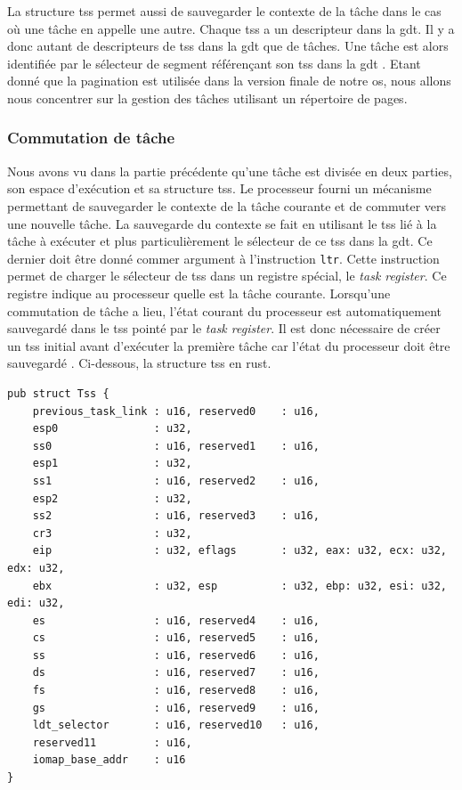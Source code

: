 La structure \acrshort{tss} permet aussi de sauvegarder le contexte de la tâche
dans le cas où une tâche en appelle une autre. Chaque \acrshort{tss} a un descripteur
dans la \acrshort{gdt}. Il y a donc autant de descripteurs de \acrshort{tss} dans
la \acrshort{gdt} que de tâches. Une tâche est alors identifiée par le sélecteur
de segment référençant son \acrshort{tss} dans la \acrshort{gdt} \cite{ref42}. Etant
donné que la pagination est utilisée dans la version finale de notre \acrshort{os},
nous allons nous concentrer sur la gestion des tâches utilisant un répertoire de
pages.


\subsubsection{Commutation de tâche}
Nous avons vu dans la partie précédente qu'une tâche est divisée en deux parties,
son espace d'exécution et sa structure \acrshort{tss}. Le processeur fourni un
mécanisme permettant de sauvegarder le contexte de la tâche courante et de commuter
vers une nouvelle tâche. La sauvegarde du contexte se fait en utilisant le \acrshort{tss}
lié à la tâche à exécuter et plus particulièrement le sélecteur de ce \acrshort{tss}
dans la \acrshort{gdt}. Ce dernier doit être donné commer argument à l'instruction
\texttt{ltr}. Cette instruction permet de charger le sélecteur de \acrshort{tss}
dans un registre spécial, le \textit{task register}. Ce registre indique au processeur
quelle est la tâche courante. Lorsqu'une commutation de tâche a lieu, l'état
courant du processeur est automatiquement sauvegardé dans le \acrshort{tss} pointé
par le \textit{task register}. Il est donc nécessaire de créer un \acrshort{tss}
initial avant d'exécuter la première tâche car l'état du processeur doit être
sauvegardé \cite{ref42}. Ci-dessous, la structure \acrshort{tss} en rust.

\begin{verbatim}
pub struct Tss {
    previous_task_link : u16, reserved0    : u16,
    esp0               : u32,
    ss0                : u16, reserved1    : u16,
    esp1               : u32,
    ss1                : u16, reserved2    : u16,
    esp2               : u32,
    ss2                : u16, reserved3    : u16,
    cr3                : u32,
    eip                : u32, eflags       : u32, eax: u32, ecx: u32, edx: u32,
    ebx                : u32, esp          : u32, ebp: u32, esi: u32, edi: u32,
    es                 : u16, reserved4    : u16,
    cs                 : u16, reserved5    : u16,
    ss                 : u16, reserved6    : u16,
    ds                 : u16, reserved7    : u16,
    fs                 : u16, reserved8    : u16,
    gs                 : u16, reserved9    : u16,
    ldt_selector       : u16, reserved10   : u16,
    reserved11         : u16,
    iomap_base_addr    : u16
}
\end{verbatim}

